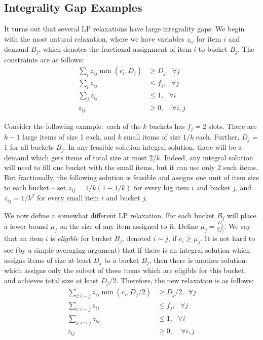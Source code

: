 \subsection{Integrality Gap Examples}
It turns out that several LP relaxations have large integrality gaps. We begin with the most natural relaxation, where we have variables $z_{ij}$ for item $i$ and demand $B_j$, which denotes the fractional assignment of item $i$ to bucket $B_j$. The constraints are as follows:
\begin{align*}
\sum_{i} z_{ij} \min(c_i, D_j) & \geq D_j, \ \  \forall j \\
\sum_i z_{ij} & \leq f_j, \ \ \ \forall j \\
\sum_j z_{ij} & \leq 1,  \ \ \ \forall i \\
z_{ij} & \geq 0, \ \ \ \ \ \forall i,j
\end{align*}

Consider the following example:~each of the $k$ buckets has $f_j = 2$ slots. There are $k-1$ large items of size 1 each, and $k$ small items of size $1/k$ each. Further, $D_j$ = 1 for all buckets $B_j$. In any feasible solution integral solution, there will be a demand which gets items of total size at most $2/k$. Indeed, any integral solution will need to fill one bucket with the small items, but it can use only 2 such items. But fractionally, the following solution is feasible and assigns one unit of item size to each bucket -- set $z_{ij} = 1/k (1-1/k)$ for every big item $i$ and bucket $j$, and
$z_{ij} = 1/k^2$ for every small item $i$ and bucket $j$.

We now define a somewhat different LP relaxation. For each bucket $B_j$ will place a lower bound $\mu_j$ on the size of any item assigned to it. Define $\mu_j = \frac{D_j}{2 f_j}$. We say that an item $i$ is {\em eligible} for bucket $B_j$, denoted $i \sim j$,  if $c_i \geq \mu_j$. It is not hard to see (by a simple averaging argument) that if there is an integral solution which assigns items of size at least $D_j$ to a bucket $B_j$, then there is another solution which assigns only the subset of these   items which are eligible for this bucket, and achieves total size at least $D_j/2$. Therefore, the new relaxation is as follows:
\begin{align*}
\sum_{i: i \sim j} z_{ij} \min(c_i, D_j/2) & \geq D_j/2, \ \  \forall j \\
\sum_{i: i \sim j} z_{ij} & \leq f_j, \ \ \ \forall j \\
\sum_{j: i \sim j} z_{ij} & \leq 1,  \ \ \ \forall i \\
z_{ij} & \geq 0, \ \ \ \ \ \forall i,j
\end{align*}

